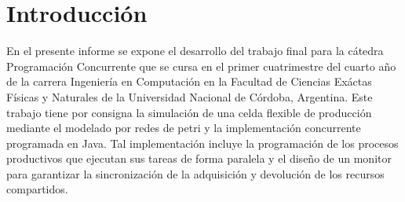 \documentclass[12pt]{article} %
\begin{document}

\tableofcontents %

\newpage %


\section{Introducción} %

En el presente informe se expone el desarrollo del trabajo final para la cátedra Programación Concurrente que se cursa en el primer cuatrimestre del cuarto año de la carrera Ingeniería en Computación en la Facultad de Ciencias Exáctas Físicas y Naturales de la Universidad Nacional de Córdoba, Argentina. 
Este trabajo tiene por consigna la simulación de una celda flexible de producción mediante el modelado por redes de petri y la implementación concurrente programada en Java. Tal implementación incluye la programación de los procesos productivos que ejecutan sus tareas de forma paralela y el diseño de un monitor para garantizar la sincronización de la adquisición y devolución de los recursos compartidos.  

\end{document}
